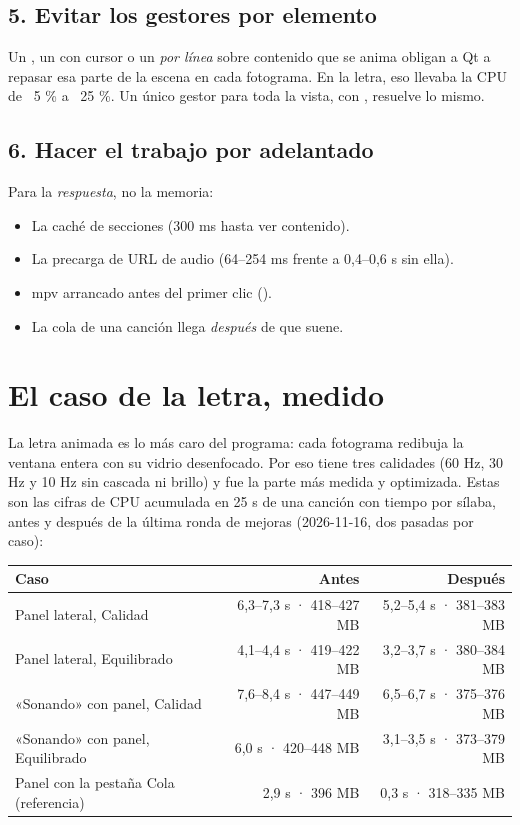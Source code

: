 \subsection{5. Evitar los gestores por elemento}

Un , un  con cursor o un  \emph{por línea}
sobre contenido que se anima obligan a Qt a repasar esa parte de la escena en cada fotograma.
En la letra, eso llevaba la CPU de ~5 \% a ~25 \%. Un único gestor para toda la vista, con
, resuelve lo mismo.

\subsection{6. Hacer el trabajo por adelantado}

Para la \emph{respuesta}, no la memoria:

\begin{itemize}
  \item La caché de secciones (300 ms hasta ver contenido).
  \item La precarga de URL de audio (64--254 ms frente a 0,4--0,6 s sin ella).
  \item mpv arrancado antes del primer clic ().
  \item La cola de una canción llega \emph{después} de que suene.
\end{itemize}

\section{El caso de la letra, medido}

La letra animada es lo más caro del programa: cada fotograma redibuja la ventana entera con
su vidrio desenfocado. Por eso tiene tres calidades (60 Hz, 30 Hz y 10 Hz sin cascada ni
brillo) y fue la parte más medida y optimizada. Estas son las cifras de CPU acumulada en 25 s
de una canción con tiempo por sílaba, antes y después de la última ronda de mejoras (2026-11-16,
dos pasadas por caso):

\begin{center}
\small
\begin{tabularx}{\linewidth}{@{}Xrr@{}}
\toprule
Caso & Antes & Después \\
\midrule
Panel lateral, Calidad & 6,3--7,3 s · 418--427 MB & 5,2--5,4 s · 381--383 MB \\
Panel lateral, Equilibrado & 4,1--4,4 s · 419--422 MB & 3,2--3,7 s · 380--384 MB \\
«Sonando» con panel, Calidad & 7,6--8,4 s · 447--449 MB & 6,5--6,7 s · 375--376 MB \\
«Sonando» con panel, Equilibrado & 6,0 s · 420--448 MB & 3,1--3,5 s · 373--379 MB \\
Panel con la pestaña Cola (referencia) & 2,9 s · 396 MB & 0,3 s · 318--335 MB \\
\bottomrule
\end{tabularx}
\end{center}


